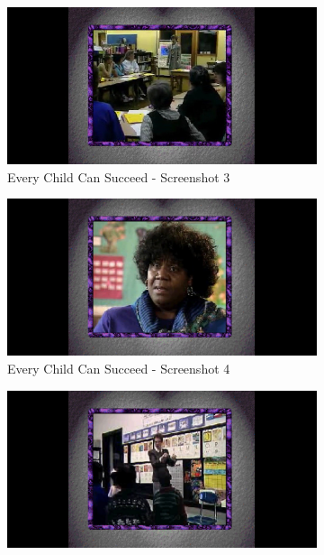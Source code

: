 \begin{figure}[H]
    \begin{subfigure}{0.45\textwidth}
        \centering
        \includegraphics[width=\linewidth]{Games/EveryChildCanSucceed/Images/EveryChildCanSucceedScreenshot3.jpg}
        \caption{Every Child Can Succeed - Screenshot 3}
    \end{subfigure}
    \begin{subfigure}{0.45\textwidth}
        \centering
        \includegraphics[width=\linewidth]{Games/EveryChildCanSucceed/Images/EveryChildCanSucceedScreenshot4.jpg}
        \caption{Every Child Can Succeed - Screenshot 4}
    \end{subfigure}
    \begin{subfigure}{0.45\textwidth}
        \centering
        \includegraphics[width=\linewidth]{Games/EveryChildCanSucceed/Images/EveryChildCanSucceedScreenshot5.jpg}

\end{subfigure}
\end{figure}
